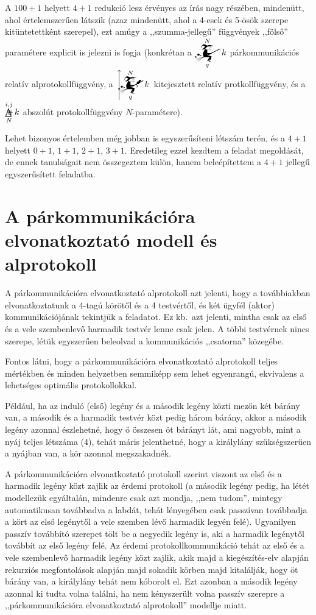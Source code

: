 \documentclass{article}
\newcommand{\mainfuncomm}[3]{\mathwitch_{#2}^{#1}#3}
\newcommand{\mainfunext}[3]{\left\uparrow\!\!\!\mathwitch*_{#2}^{#1}#3\right.}
\begin{document}
	A $100 + 1$ helyett $4 + 1$ redukció lesz érvényes az írás nagy részében, mindenütt, ahol értelemszerűen látszik (azaz mindenütt, ahol a 4-esek és 5-ösök szerepe kitüntetettként szerepel), ezt amúgy a ,,szumma-jellegű'' függvények ,,fölső'' paramétere explicit is jelezni is fogja (konkrétan a $\displaystyle\mainfuncomm Nqk$ párkommunikációs relatív alprotokollfüggvény, a $\displaystyle\mainfunext Nqk$ kitejesztett relatív protkollfüggvény, és a $\mathop{\bigtriangleup\mspace{-14.607mu}\divideontimes}\limits_N^{i,j}k$ abszolút protokollfüggvény $N$-paramétere).

	Lehet bizonyos értelemben még jobban is egyszerűsíteni létszám terén, és a $4+1$ helyett $0+1$,  $1+1$,  $2+1$,  $3+1$. Eredetileg ezzel kezdtem a feladat megoldását, de ennek tanulságait nem összegeztem külön, hanem beleépítettem a $4+1$ jellegű egyszerűsített feladatba.


	\section{A párkommunikációra elvonatkoztató modell és alprotokoll}

	A párkommunikációra elvonatkoztató alprotokoll azt jelenti, hogy a továbbiakban elvonatkoztatunk a 4-tagú körötől és a 4 testvértől, és két ügyfél (aktor) kommunikációjának tekintjük a feladatot.
	Ez kb.~azt jelenti, mintha csak az első és a vele szembenlevő harmadik testvér lenne csak jelen. A többi testvérnek nincs szerepe, létük egyszerűen beleolvad a kommunikációs ,,csatorna'' közegébe. 

	Fontos látni, hogy a párkommunikációra elvonatkoztató alprotokoll teljes mértékben és minden helyzetben semmiképp sem lehet egyenrangú, ekvivalens a lehetséges optimális protokollokkal.

	Például, ha az induló (első) legény és a második legény közti mezőn két bárány van, a második és a harmadik testvér közt pedig három bárány, akkor a második legény azonnal észlehetné, hogy ő összesen öt bárányt lát, ami nagyobb, mint a nyáj teljes létszáma (4), tehát máris jelenthetné, hogy a királylány szükségszerűen a nyájban van, a kör azonnal megszakadnék.

	A párkommunikációra elvonatkoztató protokoll szerint viszont az első és a harmadik legény közt zajlik az  érdemi protokoll (a második legény pedig, ha létét modellezük egyáltalán, mindenre csak azt mondja, ,,nem tudom'', mintegy automatikusan továbbadva a labdát, tehát lényegében csak passzívan továbbadja a kört az első legénytől a vele szemben lévő harmadik legyén felé). Ugyanilyen passzív továbbító szerepet tölt be a negyedik legény is, aki a harmadik legénytől továbbít az első legény felé. Az érdemi protokollkommunikáció tehát az első és a vele szembenlevő harmadik legény közt zajlik, akik majd a kiegészítés-elv alapján rekurziós megfontolások alapján majd sokadik körben majd kitalálják, hogy öt bárány van, a királylány tehát nem kóborolt el. Ezt azonban a második legény azonnal ki tudta volna találni, ha nem kényszerült volna passzív szerepre a ,,párkommunikációra elvonatkoztató alprotokoll'' modellje miatt.
\end{document}

